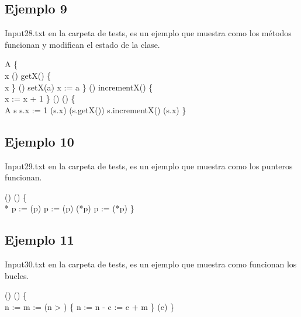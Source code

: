 \newpage

\subsection{Ejemplo 9}
Input28.txt en la carpeta de tests, es un ejemplo que muestra como los m\'{e}todos funcionan y modifican el estado de la clase.


\begin{algorithm}

	 A \{ \\
	\quad {} x \; 
	\quad {}() getX() \{ \\
	\quad \quad {} x\;	
	\quad \}\;
	\quad {}() setX(a) \;
	\quad \quad x := a\;	
	\quad \}\;
	\quad {}() incrementX() \{ \\
	\quad \quad x := x + 1\;	
	\quad \}\;
	\Void() () \{ \\
	\quad {} A s\;
	\quad s.x := 1 \;
	\quad {}(s.x)\;
	\quad {}(s.getX())\;
	\quad s.incrementX() \;
	\quad {}(s.x)\;	
	\}\;
	
\end{algorithm}

\newpage

\subsection{Ejemplo 10}
Input29.txt en la carpeta de tests, es un ejemplo que muestra como los punteros funcionan.


\begin{algorithm}

	\Void() () \{ \\
	\quad {}* p := \;
	\quad {}(p)\;
	\quad p := \;
	\quad {}(p)\;
	\quad {}(*p)\;
	\quad *p := \;
	\quad {}(*p)\;	
	\}\;
	
\end{algorithm}

\newpage


\subsection{Ejemplo 11}
Input30.txt en la carpeta de tests, es un ejemplo que muestra como funcionan los bucles.


\begin{algorithm}

	\Void() () \{ \\
	\quad {} n := \;
	\quad {} m := \;
	\quad {}(n > ) \{
	\quad \quad n := n - \;
	\quad \quad c := c + m\;
	\quad \}
	\quad {}(c)\;	
	\}\;
	
\end{algorithm}

